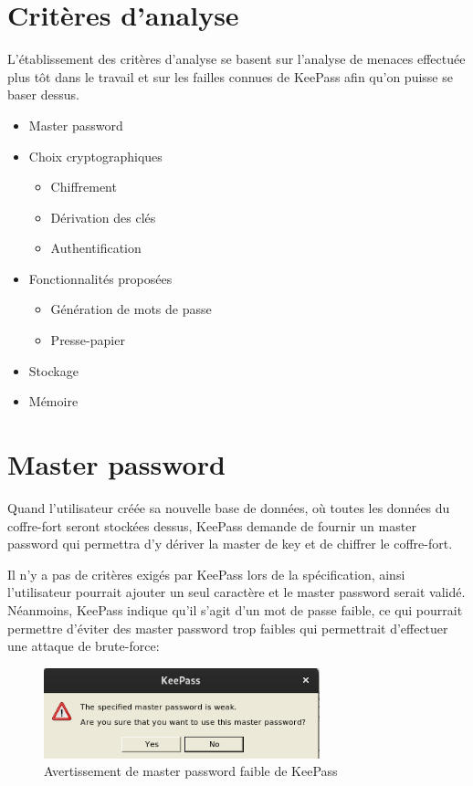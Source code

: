 \section{Critères d'analyse}

L'établissement des critères d'analyse se basent sur l'analyse de menaces effectuée plus tôt dans le travail et sur les failles connues de KeePass afin qu'on puisse se baser dessus.

\begin{itemize}
	\item Master password
	\item Choix cryptographiques
	\begin{itemize}
		\item Chiffrement
		\item Dérivation des clés
		\item Authentification
	\end{itemize}
	\item Fonctionnalités proposées
	\begin{itemize}
		\item Génération de mots de passe
		\item Presse-papier
	\end{itemize}
	\item Stockage
	\item Mémoire
\end{itemize}

\section{Master password}

Quand l'utilisateur créée sa nouvelle base de données, où toutes les données du coffre-fort seront stockées dessus, KeePass demande de fournir un master password qui permettra d'y dériver la master de key et de chiffrer le coffre-fort. 

Il n'y a pas de critères exigés par KeePass lors de la spécification, ainsi l'utilisateur pourrait ajouter un seul caractère et le master password serait validé. Néanmoins, KeePass indique qu'il s'agit d'un mot de passe faible, ce qui pourrait permettre d'éviter des master password trop faibles qui permettrait d'effectuer une attaque de brute-force:

\begin{figure}[H]
	\centering
	\includegraphics[width=8cm]{images/kp_weak.png}
	\caption{Avertissement de master password faible de KeePass}
\end{figure}

